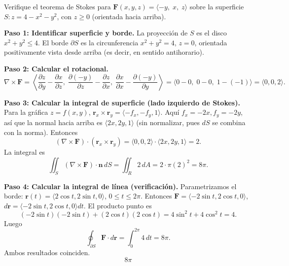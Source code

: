 \begin{example}
Verifique el teorema de Stokes para $\mathbf{F}(x,y,z)=\langle -y,\; x,\; z\rangle$ sobre la superficie $S: z=4-x^2-y^2$, con $z\ge 0$ (orientada hacia arriba).
\begin{myproof}
\textbf{Paso 1: Identificar superficie y borde.}
La proyección de $S$ es el disco $x^2+y^2\le 4$. El borde $\partial S$ es la circunferencia $x^2+y^2=4$, $z=0$, orientada positivamente vista desde arriba (es decir, en sentido antihorario).

\textbf{Paso 2: Calcular el rotacional.}
\[
\nabla\times\mathbf{F}
=
\left\langle
\frac{\partial z}{\partial y}-\frac{\partial x}{\partial z},\;
\frac{\partial (-y)}{\partial z}-\frac{\partial z}{\partial x},\;
\frac{\partial x}{\partial x}-\frac{\partial (-y)}{\partial y}
\right\rangle
=
\langle 0-0,\;0-0,\;1-(-1)\rangle
=
\langle 0,0,2\rangle.
\]

\textbf{Paso 3: Calcular la integral de superficie (lado izquierdo de Stokes).}
Para la gráfica $z=f(x,y)$, $\mathbf{r}_x\times\mathbf{r}_y=\langle -f_x,-f_y,1\rangle$. Aquí $f_x=-2x, f_y=-2y$, así que la normal hacia arriba es $\langle 2x,2y,1\rangle$ (sin normalizar, pues $dS$ se combina con la norma). Entonces
\[
(\nabla\times\mathbf{F})\cdot(\mathbf{r}_x\times\mathbf{r}_y)
= \langle 0,0,2\rangle\cdot\langle 2x,2y,1\rangle = 2.
\]
La integral es
\[
\iint_S (\nabla\times\mathbf{F})\cdot\mathbf{n}\,dS
= \iint_R 2\,dA = 2\cdot \pi(2)^2 = 8\pi.
\]

\textbf{Paso 4: Calcular la integral de línea (verificación).}
Parametrizamos el borde: $\mathbf{r}(t)=\langle 2\cos t, 2\sin t, 0\rangle$, $0\le t\le 2\pi$. Entonces $\mathbf{F}=\langle -2\sin t, 2\cos t, 0\rangle$, $d\mathbf{r}=\langle -2\sin t, 2\cos t, 0\rangle dt$. El producto punto es
\[
(-2\sin t)(-2\sin t) + (2\cos t)(2\cos t) = 4\sin^2 t + 4\cos^2 t = 4.
\]
Luego
\[
\oint_{\partial S}\mathbf{F}\cdot d\mathbf{r} = \int_0^{2\pi} 4\,dt = 8\pi.
\]
Ambos resultados coinciden.
\[
\boxed{8\pi}
\]
\end{myproof}
\end{example}

